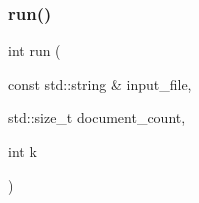 \mbox{\label{irk-hits_8cpp_a004d86ed14e88ca0ff901aa0dce269ac}} 
\subsubsection{\texorpdfstring{run()}{run()}}
{\footnotesize\ttfamily int run (\begin{DoxyParamCaption}\item[{const std\+::string \&}]{input\+\_\+file,  }\item[{std\+::size\+\_\+t}]{document\+\_\+count,  }\item[{int}]{k }\end{DoxyParamCaption})}

